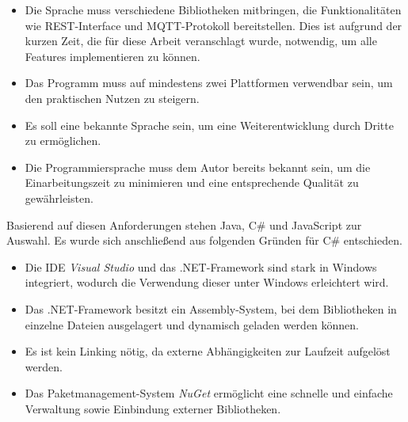     \begin{itemize}
        \item Die Sprache muss verschiedene Bibliotheken mitbringen, die Funktionalitäten wie REST-Interface und \ac{MQTT}-Protokoll bereitstellen. Dies ist aufgrund der kurzen Zeit, die für diese Arbeit veranschlagt wurde, notwendig, um alle Features implementieren zu können.
        \item Das Programm muss auf mindestens zwei Plattformen verwendbar sein, um den praktischen Nutzen zu steigern.
        \item Es soll eine bekannte Sprache sein, um eine Weiterentwicklung durch Dritte zu ermöglichen.
        \item Die Programmiersprache muss dem Autor bereits bekannt sein, um die Einarbeitungszeit zu minimieren und eine entsprechende Qualität zu gewährleisten.
    \end{itemize}
    Basierend auf diesen Anforderungen stehen Java, C\# und JavaScript zur Auswahl.
    Es wurde sich anschließend aus folgenden Gründen für C\# entschieden.
    \begin{itemize}
        \item Die \ac{IDE} \emph{Visual Studio} und das .NET-Framework sind stark in Windows integriert, wodurch die Verwendung dieser unter Windows erleichtert wird.
        \item Das .NET-Framework besitzt ein Assembly-System, bei dem Bibliotheken in einzelne Dateien ausgelagert und dynamisch geladen werden können.
        \item Es ist kein Linking nötig, da externe Abhängigkeiten zur Laufzeit aufgelöst werden.
        \item Das Paketmanagement-System \emph{NuGet} ermöglicht eine schnelle und einfache Verwaltung sowie Einbindung externer Bibliotheken.
    \end{itemize}
    
